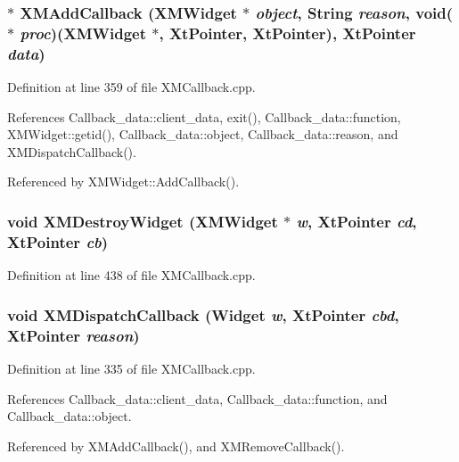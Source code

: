\subsubsection{$\ast$ XMAdd\-Callback ({\bf XMWidget} $\ast$ {\em object}, String {\em reason}, void($\ast$ {\em proc})({\bf XMWidget} $\ast$, Xt\-Pointer, Xt\-Pointer), Xt\-Pointer {\em data})}\label{XMCallback_8cpp_a4}




Definition at line 359 of file XMCallback.cpp.

References Callback\_\-data::client\_\-data, exit(), Callback\_\-data::function, XMWidget::getid(), Callback\_\-data::object, Callback\_\-data::reason, and XMDispatch\-Callback().

Referenced by XMWidget::Add\-Callback().
\subsubsection{\setlength{\rightskip}{0pt plus 5cm}void XMDestroy\-Widget ({\bf XMWidget} $\ast$ {\em w}, Xt\-Pointer {\em cd}, Xt\-Pointer {\em cb})}\label{XMCallback_8cpp_a7}




Definition at line 438 of file XMCallback.cpp.
\subsubsection{\setlength{\rightskip}{0pt plus 5cm}void XMDispatch\-Callback (Widget {\em w}, Xt\-Pointer {\em cbd}, Xt\-Pointer {\em reason})\hspace{0.3cm}{\tt  [static]}}\label{XMCallback_8cpp_a3}




Definition at line 335 of file XMCallback.cpp.

References Callback\_\-data::client\_\-data, Callback\_\-data::function, and Callback\_\-data::object.

Referenced by XMAdd\-Callback(), and XMRemove\-Callback().
